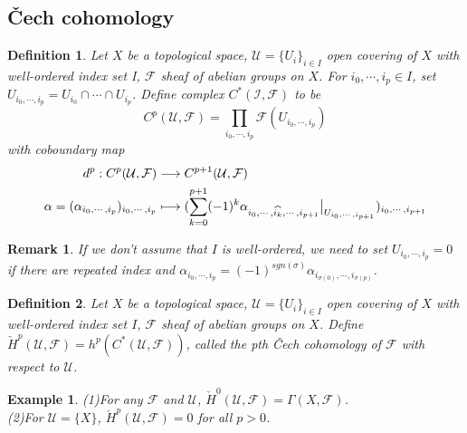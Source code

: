 \documentclass{ctexart}
\newtheorem{definition}{Definition}[section]
\newtheorem{remark}{Remark}[section]
\newtheorem{example}{Example}[section]
\begin{document}
\subsection{Čech cohomology}
\label{subsection:Sheaf_Cohomology_Čech_cohomology}

\begin{definition}
    Let $X$ be a topological space, $\mathcal{U} = \{U_{i}\}_{i\in I}$ open covering of $X$ with well-ordered index set I, $\mathcal{F}$ sheaf of abelian groups on $X$.
    For $i_{0}, \cdots, i_{p}\in I$, set $U_{i_{0}, \cdots, i_{p}} = U_{i_{0}} \cap \cdots \cap U_{i_{p}}$.
    Define complex $C^{\ast}(\mathcal{I}, \mathcal{F})$ to be 
    \begin{equation*}
        C^{p}(\mathcal{U}, \mathcal{F}) = \prod_{i_{0}, \cdots, i_{p}} \mathcal{F}(U_{i_{0}, \cdots, i_{p}})
    \end{equation*}
    with coboundary map 
    \begin{equation*}
        \begin{split}
            d^{p}: C^{p}(\mathcal{U}, \mathcal{F}) & \longrightarrow C^{p + 1}(\mathcal{U}, \mathcal{F}) \\
            \alpha = (\alpha_{i_{0}, \cdots, i_{p}})_{i_{0}, \cdots, i_{p}} & \longmapsto (\sum_{k = 0}^{p + 1} (-1)^{k}\alpha_{i_{0}, \cdots, \widehat{i_{k}}, \cdots, i_{p + 1}}\big{|}_{U_{i_{0}, \cdots, i_{p + 1}}})_{i_{0}, \cdots, i_{p + 1}}
        \end{split}
    \end{equation*}
\end{definition}
\begin{remark}
    If we don't assume that $I$ is well-ordered, we need to set $U_{i_{0}, \cdots, i_{p}} = 0$ if there are repeated index and $\alpha_{i_{0}, \cdots, i_{p}} = (-1)^{sgn(\sigma)}\alpha_{i_{\sigma(0)}, \cdots, i_{\sigma(p)}}$.
\end{remark}
\begin{definition}
    Let $X$ be a topological space, $\mathcal{U} = \{U_{i}\}_{i\in I}$ open covering of $X$ with well-ordered index set $I$, $\mathcal{F}$ sheaf of abelian groups on $X$.
    Define $\check{H}^{p}(\mathcal{U}, \mathcal{F}) = h^{p}(C^{\ast}(\mathcal{U}, \mathcal{F}))$, called the pth Čech cohomology of $\mathcal{F}$ with respect to $\mathcal{U}$.
\end{definition}
\begin{example}
    (1)For any $\mathcal{F}$ and $\mathcal{U}$, $\check{H}^{0}(\mathcal{U}, \mathcal{F}) = \Gamma(X, \mathcal{F})$. \\
    (2)For $\mathcal{U} = \{X\}$, $\check{H}^{p}(\mathcal{U}, \mathcal{F}) = 0$ for all $p > 0$.
\end{example}
\end{document}
